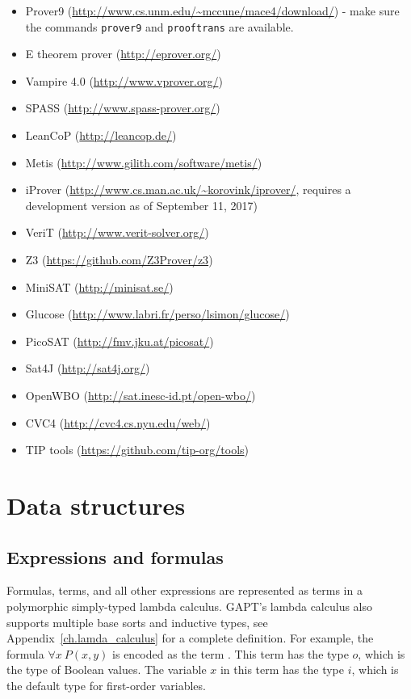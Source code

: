 \documentclass[a4paper,11pt]{book}
\newcommand{\cli}[1]{{\ttfamily {#1}}}
\begin{document}
\begin{itemize}
\item Prover9 (\url{http://www.cs.unm.edu/~mccune/mace4/download/}) - make sure
  the commands \texttt{prover9} and \texttt{prooftrans} are available.
\item E theorem prover (\url{http://eprover.org/})
\item Vampire 4.0 (\url{http://www.vprover.org/})
\item SPASS (\url{http://www.spass-prover.org/})
\item LeanCoP (\url{http://leancop.de/})
\item Metis (\url{http://www.gilith.com/software/metis/})
\item iProver (\url{http://www.cs.man.ac.uk/~korovink/iprover/}, requires
  a development version as of September 11, 2017)
\item VeriT (\url{http://www.verit-solver.org/})
\item Z3 (\url{https://github.com/Z3Prover/z3})
\item MiniSAT (\url{http://minisat.se/})
\item Glucose (\url{http://www.labri.fr/perso/lsimon/glucose/})
\item PicoSAT (\url{http://fmv.jku.at/picosat/})
\item Sat4J (\url{http://sat4j.org/})
\item OpenWBO (\url{http://sat.inesc-id.pt/open-wbo/})
\item CVC4 (\url{http://cvc4.cs.nyu.edu/web/})
\item TIP tools (\url{https://github.com/tip-org/tools})
\end{itemize}

\chapter{Data structures}

\section{Expressions and formulas}

Formulas, terms, and all other expressions are represented as terms in a
polymorphic simply-typed lambda calculus. GAPT's lambda calculus also supports
multiple base sorts and inductive types, see Appendix~\ref{ch.lamda_calculus}
for a complete definition. For example, the formula $\forall
x\: P(x, y)$ is encoded as the term \cli{'$\forall$' ($\lambda$x (P x) y)}.
This term has the type $o$, which is the type of Boolean values.  The variable
$x$ in this term has the type $i$, which is the default type for first-order
variables.
\end{document}
